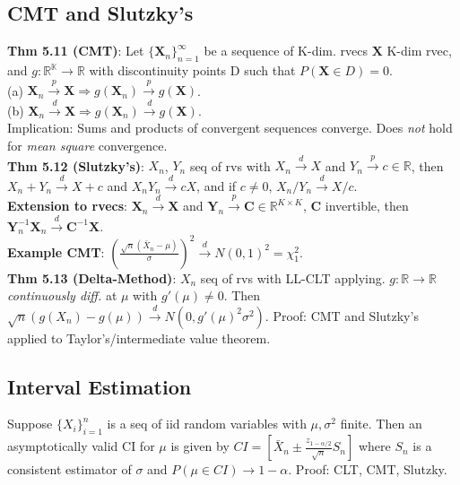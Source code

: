 \subsection{CMT and Slutzky's}
\textbf{Thm 5.11 (CMT)}: Let $\{\textbf{X}_n\}_{n=1}^\infty$ be a sequence of K-dim. rvecs $\textbf{X}$ K-dim rvec, and $g:\mathbb{R^K}\to\mathbb{R}$ with discontinuity points D such that $P(\textbf{X}\in D)=0$. \\
(a) $\textbf{X}_n \xrightarrow{p} \textbf{X} \Rightarrow g(\textbf{X}_n) \xrightarrow{p} g(\textbf{X})$.\\
(b) $\textbf{X}_n \xrightarrow{d} \textbf{X} \Rightarrow g(\textbf{X}_n) \xrightarrow{d} g(\textbf{X})$. \\
Implication: Sums and products of convergent sequences converge. Does \emph{not} hold for \emph{mean square} convergence.\\
\textbf{Thm 5.12 (Slutzky's)}: $X_n$, $Y_n$ seq of rvs with $X_n\xrightarrow{d} X$ and $Y_n\xrightarrow{p} c\in \mathbb{R}$, then $X_n + Y_n \xrightarrow{d} X + c$ and $X_nY_n\xrightarrow{d}cX$, and if $c\neq0$, $X_n/Y_n \xrightarrow{d} X/c$. \\
\textbf{Extension to rvecs}: $\textbf{X}_n \xrightarrow{d} \textbf{X}$ and $\textbf{Y}_n\xrightarrow{p}\textbf{C}\in\mathbb{R}^{K\times K}$, $\textbf{C}$ invertible, then $\textbf{Y}_n^{-1}\textbf{X}_n\xrightarrow{d}\textbf{C}^{-1}\textbf{X}$. \\
\textbf{Example CMT}: $\left(\frac{\sqrt{n}(\bar{X}_n - \mu)}{\sigma}\right)^2 \xrightarrow{d} N(0,1)^2 = \chi_1^2$.\\
\textbf{Thm 5.13 (Delta-Method)}: $X_n$ seq of rvs with LL-CLT applying. $g:\mathbb{R}\to\mathbb{R}$ \emph{continuously diff.} at $\mu$ with $g'(\mu)\neq0$. Then $\sqrt{n}(g(X_n)-g(\mu)) \xrightarrow{d} N(0, g'(\mu)^2\sigma^2)$. Proof: CMT and Slutzky's applied to Taylor's/intermediate value theorem. 

\subsection{Interval Estimation}
Suppose $\{X_i\}_{i=1}^n$ is a seq of iid random variables with $\mu, \sigma^2$ finite. Then an asymptotically valid CI for $\mu$ is given by 
$CI = \left[\bar{X}_n \pm \frac{z_{1-\alpha/2}}{\sqrt{n}}S_n\right]$
where $S_n$ is a consistent estimator of $\sigma$ and $P(\mu\in CI) \to 1-\alpha$. Proof: CLT, CMT, Slutzky. 

